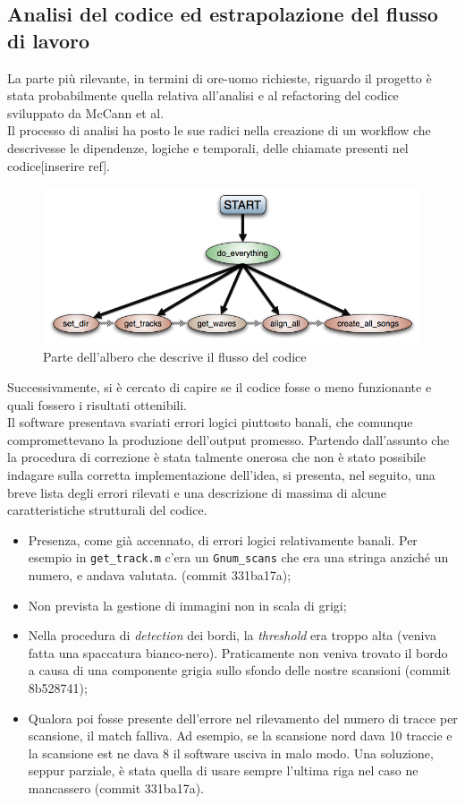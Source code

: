 \subsection{Analisi del codice ed estrapolazione del flusso di lavoro}
La parte più rilevante, in termini di ore-uomo richieste, riguardo il
progetto è stata probabilmente quella relativa all'analisi e al refactoring
del codice sviluppato da McCann et al. \\
Il processo di analisi ha posto le sue radici nella creazione di un 
workflow che descrivesse le dipendenze, logiche e temporali, delle chiamate
presenti nel codice[inserire ref]. 
\begin{figure}[h!t]
\begin{center}
\includegraphics[scale=0.3]{./img/workflow.png}
\caption{Parte dell'albero che descrive il flusso del codice}\label{fading}
\end{center}
\end{figure}
Successivamente, si è cercato di capire 
se il codice fosse o meno funzionante e quali fossero i risultati 
ottenibili. \\
Il software presentava svariati errori logici piuttosto banali, che 
comunque compromettevano la produzione dell'output promesso. Partendo
dall'assunto che la procedura di correzione è stata talmente
onerosa che non è stato possibile indagare sulla corretta implementazione
dell'idea, si presenta, nel seguito, una breve lista degli errori rilevati e una 
descrizione di massima di alcune caratteristiche strutturali del codice.

\begin{itemize}
\item Presenza, come già accennato, di errori logici relativamente banali. 
Per esempio in \texttt{get\_track.m} c'era un \texttt{Gnum\_scans} che era 
una stringa anzich\'e un numero, e andava valutata. (commit 331ba17a);
\item Non prevista la gestione di immagini non in scala di grigi;
\item Nella procedura di \emph{detection} dei bordi, la
\emph{threshold} era troppo alta (veniva fatta una spaccatura bianco-nero). 
Praticamente non veniva trovato il bordo a causa di una componente
grigia sullo sfondo delle nostre scansioni (commit 8b528741);
\item Qualora poi fosse presente dell'errore nel rilevamento del numero 
di tracce 
per scansione, il match falliva. Ad esempio, se la scansione nord 
dava 10 traccie e la scansione est ne dava 8 il software usciva in malo
modo. Una soluzione, seppur parziale, è stata quella di usare 
sempre l'ultima riga nel caso ne mancassero (commit 331ba17a).
\end{itemize}

